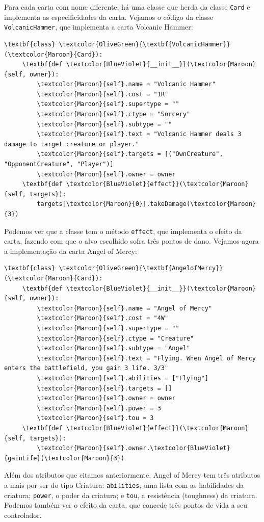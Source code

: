 \documentclass[dvipsnames]{book}
\begin{document}
Para cada carta com nome diferente, há uma classe que herda da classe \texttt{Card} e implementa
as especificidades da carta. Vejamos o código da classe \texttt{VolcanicHammer}, que implementa
a carta Volcanic Hammer:
\begin{Verbatim}[commandchars=\\\{\}]
 \textbf{class} \textcolor{OliveGreen}{\textbf{VolcanicHammer}}(\textcolor{Maroon}{Card}):
     \textbf{def \textcolor{BlueViolet}{__init__}}(\textcolor{Maroon}{self, owner}):
         \textcolor{Maroon}{self}.name = "Volcanic Hammer"
         \textcolor{Maroon}{self}.cost = "1R"
         \textcolor{Maroon}{self}.supertype = ""
         \textcolor{Maroon}{self}.ctype = "Sorcery"
         \textcolor{Maroon}{self}.subtype = ""
         \textcolor{Maroon}{self}.text = "Volcanic Hammer deals 3 damage to target creature or player."
         \textcolor{Maroon}{self}.targets = [("OwnCreature", "OpponentCreature", "Player")]
         \textcolor{Maroon}{self}.owner = owner
     \textbf{def \textcolor{BlueViolet}{effect}}(\textcolor{Maroon}{self, targets}):
         targets[\textcolor{Maroon}{0}].takeDamage(\textcolor{Maroon}{3})
\end{Verbatim}
Podemos ver que a classe tem o método \texttt{effect}, que implementa o efeito da carta,
fazendo com que o alvo escolhido sofra três pontos de dano. Vejamos agora a implementação
da carta Angel of Mercy:
\begin{Verbatim}[commandchars=\\\{\}]
 \textbf{class} \textcolor{OliveGreen}{\textbf{AngelofMercy}}(\textcolor{Maroon}{Card}):
     \textbf{def \textcolor{BlueViolet}{__init__}}(\textcolor{Maroon}{self, owner}):
         \textcolor{Maroon}{self}.name = "Angel of Mercy"
         \textcolor{Maroon}{self}.cost = "4W"
         \textcolor{Maroon}{self}.supertype = ""
         \textcolor{Maroon}{self}.ctype = "Creature"
         \textcolor{Maroon}{self}.subtype = "Angel"
         \textcolor{Maroon}{self}.text = "Flying. When Angel of Mercy enters the battlefield, you gain 3 life. 3/3"
         \textcolor{Maroon}{self}.abilities = ["Flying"]
         \textcolor{Maroon}{self}.targets = []
         \textcolor{Maroon}{self}.owner = owner
         \textcolor{Maroon}{self}.power = 3
         \textcolor{Maroon}{self}.tou = 3
     \textbf{def \textcolor{BlueViolet}{effect}}(\textcolor{Maroon}{self, targets}):
         \textcolor{Maroon}{self}.owner.\textcolor{BlueViolet}{gainLife}(\textcolor{Maroon}{3})
\end{Verbatim}
Além dos atributos que citamos anteriormente, Angel of Mercy tem três atributos a mais por
ser do tipo Criatura: \texttt{abilities}, uma lista com as habilidades da criatura;
\texttt{power}, o poder da criatura; e \texttt{tou}, a resistência (toughness) da criatura.
Podemos também ver o efeito da carta, que concede três pontos de vida a seu controlador.
\end{document}
